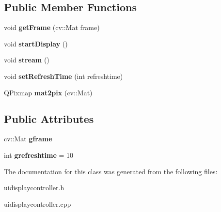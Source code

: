 \subsection*{Public Member Functions}
\begin{DoxyCompactItemize}
\item 
\mbox{\label{classuidisplaycontroller_a377e0aedef5c3dad360dcb113bdc6162}} 
void {\bfseries get\+Frame} (cv\+::\+Mat frame)
\item 
\mbox{\label{classuidisplaycontroller_a383f8bab4aa3bd94ddd51cbf69f4f39a}} 
void {\bfseries start\+Display} ()
\item 
\mbox{\label{classuidisplaycontroller_ae0fcbbee2b5dfdf269c9de884264550d}} 
void {\bfseries stream} ()
\item 
\mbox{\label{classuidisplaycontroller_a64740ec6d0373f424071498bb6b7c93d}} 
void {\bfseries set\+Refresh\+Time} (int refreshtime)
\item 
\mbox{\label{classuidisplaycontroller_aa1c66e5835c4df044270142aaf48a757}} 
Q\+Pixmap {\bfseries mat2pix} (cv\+::\+Mat)
\end{DoxyCompactItemize}
\subsection*{Public Attributes}
\begin{DoxyCompactItemize}
\item 
\mbox{\label{classuidisplaycontroller_aaa5954c1bc69f6b1adf3f972844c8ec0}} 
cv\+::\+Mat {\bfseries gframe}
\item 
\mbox{\label{classuidisplaycontroller_af1d2dfd4dd2952ea06b09c6ba4708eb7}} 
int {\bfseries grefreshtime} = 10
\end{DoxyCompactItemize}


The documentation for this class was generated from the following files\+:\begin{DoxyCompactItemize}
\item 
uidisplaycontroller.\+h\item 
uidisplaycontroller.\+cpp\end{DoxyCompactItemize}
